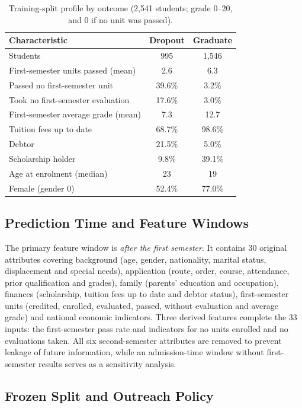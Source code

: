 \begin{table}[!htb]
\centering
\caption{Training-split profile by outcome (2,541 students; grade 0--20, and 0 if no unit was passed).}
\label{tab:eda}
\footnotesize
\setlength{\tabcolsep}{4pt}
\begin{tabular}{@{}lcc@{}}
\toprule
\textbf{Characteristic} & \textbf{Dropout} & \textbf{Graduate} \\
\midrule
Students & 995 & 1,546 \\
First-semester units passed (mean) & 2.6 & 6.3 \\
Passed no first-semester unit & 39.6\% & 3.2\% \\
Took no first-semester evaluation & 17.6\% & 3.0\% \\
First-semester average grade (mean) & 7.3 & 12.7 \\
Tuition fees up to date & 68.7\% & 98.6\% \\
Debtor & 21.5\% & 5.0\% \\
Scholarship holder & 9.8\% & 39.1\% \\
Age at enrolment (median) & 23 & 19 \\
Female (gender 0) & 52.4\% & 77.0\% \\
\bottomrule
\end{tabular}
\end{table}

\subsection{Prediction Time and Feature Windows}

The primary feature window is \emph{after the first semester}. It contains 30 original attributes
covering background (age, gender, nationality, marital status, displacement and special needs),
application (route, order, course, attendance, prior qualification and grades), family (parents'
education and occupation), finances (scholarship, tuition fees up to date and debtor status),
first-semester units (credited, enrolled, evaluated, passed, without evaluation and average grade)
and national economic indicators. Three derived features complete the 33 inputs: the
first-semester pass rate and indicators for no units enrolled and no evaluations taken. All six
second-semester attributes are removed to prevent leakage of future information, while an
admission-time window without first-semester results serves as a sensitivity analysis.

\subsection{Frozen Split and Outreach Policy}

